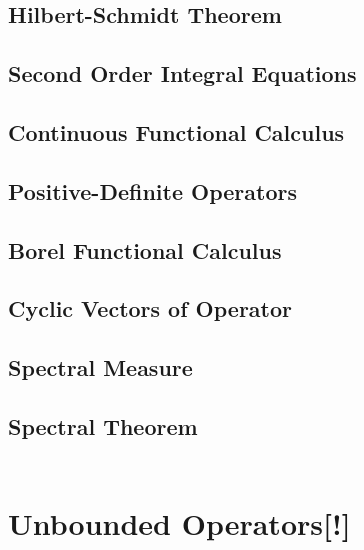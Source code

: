 \documentclass[12pt]{scrartcl}
\renewcommand{\.}{\; . \;}
\newcommand{\Page}[1]{\begin{align*} #1 \end{align*} \newpage   }
\begin{document}
\subsection{Hilbert-Schmidt Theorem}
\subsection{Second Order Integral Equations }
\subsection{Continuous Functional Calculus}
\subsection{Positive-Definite Operators}
\subsection{Borel Functional Calculus}
\subsection{Cyclic Vectors of Operator}
\subsection{Spectral Measure}
\subsection{Spectral Theorem}
\Page{}
\section{Unbounded Operators[!]}
\end{document}
